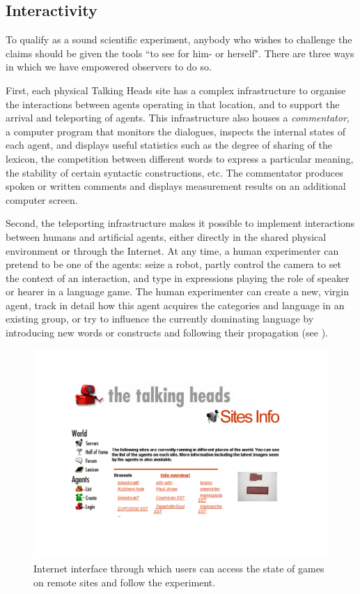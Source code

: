 \subsection{Interactivity}

To qualify as a sound scientific experiment, anybody 
who wishes to challenge the claims should be given 
the tools ``to see for him- or herself". There are three 
ways in which we have empowered observers to do so. 

First, each physical Talking Heads site has 
a complex infrastructure to organise the interactions between
agents operating in that location, and to support the
arrival and teleporting of agents. This infrastructure also houses
a {\itshape commentator}, a computer program that
monitors the dialogues, inspects the internal states of each
agent, and displays useful statistics such as the degree
of sharing of the lexicon, the competition between different
words to express a particular meaning, the stability of 
certain syntactic constructions, etc. The commentator 
produces spoken or written comments and displays
measurement results on an additional computer screen. 

Second, the teleporting infrastructure makes it possible 
to implement interactions between humans and artificial agents, 
either directly in the shared physical environment or 
through the Internet. At any time, a human experimenter can
pretend to be one of the agents: seize 
a robot, partly control the
camera to set the context of an interaction, and type 
in expressions playing the role of speaker or hearer in 
a language game. The human experimenter can create a 
new, virgin agent, track in detail how this agent acquires the 
categories and language in an existing group, 
or try to influence the currently dominating language
by introducing new words or constructs and following
their propagation (see ). 


\begin{figure}[htbp]
  \centerline{\includegraphics[width=\textwidth]{chap2/figs/interface.pdf}}
\caption{Internet interface through which users can 
access the state of games on remote sites and 
follow the experiment.}
\label{f:plate8}
\end{figure}

